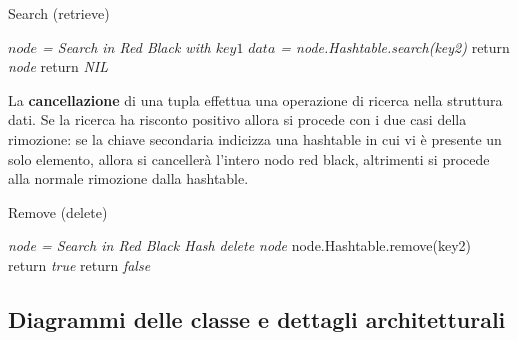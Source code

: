 \BlankLine
\IncMargin{1.5em}
\begin{algorithm}[H]
\caption{Search (retrieve) }
\emph{$node$ = Search in Red Black with $key1$}\;
 {
    \emph{$data$ = node.Hashtable.search(key2)}\;
     {
        return \emph{node}\;
    }
}
return \emph{NIL}\;
\end{algorithm}
\newpage
\indent La \textbf{cancellazione} di una tupla effettua una operazione di ricerca nella struttura dati.
Se la ricerca ha risconto positivo allora si procede con i due casi della rimozione:
se la chiave secondaria indicizza una hashtable in cui vi \`e presente un solo elemento, allora
si canceller\`a l'intero nodo red black, altrimenti si procede alla normale rimozione dalla hashtable.
\BlankLine
\IncMargin{1.5em}
\begin{algorithm}[H]
\caption{Remove (delete)}
\emph{node = Search in Red Black Hash}\;
 {
     {
    \emph{delete node}\;}
    {node.Hashtable.remove(key2)\;}
    return \emph{true}\;}
return \emph{false}\;
\end{algorithm}

\subsection{Diagrammi delle classe e dettagli architetturali}
